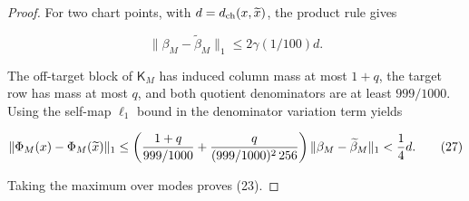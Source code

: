 \begin{lemma}
\begin{proof}
For two chart points, with \(d=d_{\rm ch}(x,\widetilde x)\), the product rule
gives

\[
\|\beta_M-\widetilde\beta_M\|_1
\le2\gamma(1/100)d.
\tag{26}
\]

The off-target block of \(\mathsf K_M\) has induced column mass at most \(1+q\), the
target row has mass at most \(q\), and both quotient denominators are at least
\(999/1000\). Using the self-map \(\ell_1\) bound in the denominator variation
term yields

\[
\|\Phi_M(x)-\Phi_M(\widetilde x)\|_1
\le\left({1+q\over999/1000}+
{q\over(999/1000)^2\,256}\right)
\|\beta_M-\widetilde\beta_M\|_1
< {1\over4}d.
\tag{27}
\]

Taking the maximum over modes proves (23). 


\end{proof}
\end{lemma}
